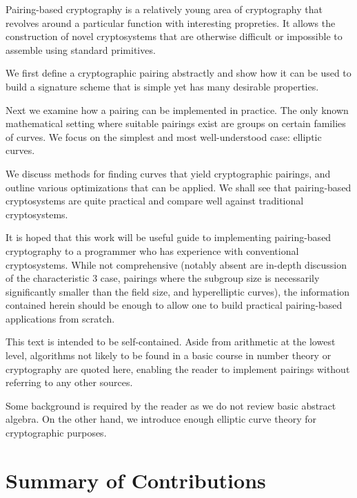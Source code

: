 \beforepreface
{}
Pairing-based cryptography is a relatively young area of cryptography that
revolves around a particular function with interesting propreties.
It allows the construction of novel cryptosystems that are otherwise
difficult or impossible to assemble using standard primitives.

We first define a cryptographic pairing abstractly and show how it
can be used to build a signature scheme that is simple yet has many
desirable properties.

Next we examine how a pairing can be implemented in practice. The only known
mathematical setting where suitable pairings exist are groups on certain
families of curves. We focus on the simplest and most well-understood case:
elliptic curves.

We discuss methods for finding curves that yield cryptographic pairings,
and outline various optimizations that can be applied. We shall see that
pairing-based cryptosystems are quite practical and compare well against
traditional cryptosystems.

It is hoped that this work will be useful guide to implementing pairing-based
cryptography to a programmer who has experience with conventional
cryptosystems. While not comprehensive (notably absent are in-depth
discussion of the characteristic 3 case, pairings where
the subgroup size is necessarily significantly smaller than the field size,
and hyperelliptic curves),
the information contained herein should be enough to allow one to build
practical pairing-based applications from scratch.

This text is intended to be self-contained. Aside from
arithmetic at the lowest level, algorithms not likely to
be found in a basic course in number theory or cryptography are quoted here,
enabling the reader to implement pairings without referring to any other
sources.

Some background is required by the reader as
we do not review basic abstract algebra.
On the other hand, we introduce enough elliptic curve theory for
cryptographic purposes.

\section {Summary of Contributions}

